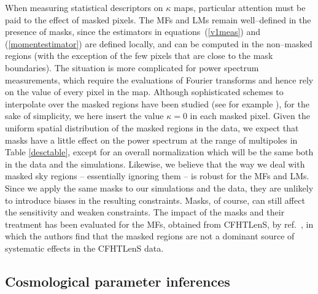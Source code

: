 \documentclass[reprint,aps,prd,superscriptaddress,showkeys,showpacs]{revtex4-1}
\begin{document}
When measuring statistical descriptors on $\kappa$ maps, particular
attention must be paid to the effect of masked pixels. The MFs and LMs
remain well--defined in the presence of masks, since the estimators in
equations~(\ref{v1meas}) and (\ref{momentestimator}) are defined
locally, and can be computed in the non--masked regions (with the
exception of the few pixels that are close to the mask
boundaries). The situation is more complicated for power spectrum
measurements, which require the evaluations of Fourier transforms and
hence rely on the value of every pixel in the map. Although
sophisticated schemes to interpolate over the masked regions have been
studied (see for example \citep{VplasInterpolation}), for the sake of
simplicity, we here insert the value $\kappa=0$ in each masked pixel.
Given the uniform spatial distribution of the masked regions in the data, we expect that masks have a little effect on the power spectrum at the range of
multipoles in Table \ref{desctable}, except for an overall normalization which will be the same both in the data and the simulations.  
Likewise, we believe that the way we deal with masked sky regions --
essentially ignoring them -- is robust for the MFs and LMs. Since we
apply the same masks to our simulations and the data, they are
unlikely to introduce biases in the resulting constraints.  Masks, of
course, can still affect the sensitivity and weaken constraints. The
impact of the masks and their treatment has been evaluated for the
MFs, obtained from CFHTLenS, by ref.~\citep{CFHTMasato}, in which the authors find that the masked regions 
are not a dominant source of systematic effects in the CFHTLenS data. 



\subsection{Cosmological parameter inferences}
\label{cosmostats}
\end{document}
